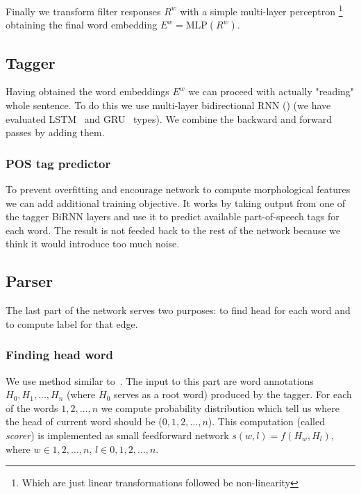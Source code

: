 Finally we transform filter responses $R^w$ with a simple multi-layer perceptron
\footnote{Which are just linear transformations followed be non-linearity}
obtaining the final word embedding $E^w = \text{MLP}(R^w)$.

\subsection{Tagger}
Having obtained the word embeddings $E^w$ we can proceed with actually "reading"
whole sentence. To do this we use multi-layer bidirectional RNN (\cite{schuster_bidirectional_1997})
(we have evaluated LSTM~\cite{RNN_LSTM} and GRU~\cite{RNN_GRU} types). We combine
the backward and forward passes by adding them.

\subsubsection{POS tag predictor}
To prevent overfitting and encourage network to compute morphological features
we can add additional training objective. It works by taking output from one of
the tagger BiRNN layers and use it to predict available part-of-speech tags for
each word. The result is not feeded back to the rest of the network because we
think it would introduce too much noise.

\subsection{Parser}
The last part of the network serves two purposes: to find head for each word and
to compute label for that edge.

\subsubsection{Finding head word}
We use method similar to~\cite{vinyals_pointer_2015}.
The input to this part are word annotations $H_0, H_1, \dots, H_n$ (where $H_0$
serves as a root word) produced by the tagger. For each of the words $1,2,\dots,n$
we compute probability distribution which tell us where the head of current
word should be ($0,1,2,\dots,n$). This computation (called \emph{scorer}) is implemented
as small feedforward network $s(w,l) = f(H_w, H_l)$, where $w \in {1,2,\dots,n}$,
$l \in {0,1,2,\dots,n}$.


